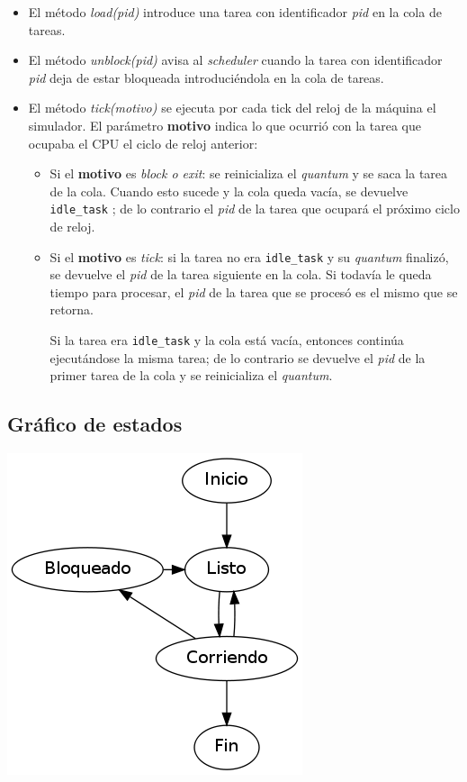 \begin{itemize}
	\item El método \textit{load(pid)} introduce una tarea con identificador \textit{pid} en la cola de tareas.
	
	\item El método \textit{unblock(pid)} avisa al \textit{scheduler} cuando la tarea con identificador \textit{pid} deja de estar bloqueada introduciéndola en la cola de tareas.
	
	\item El método \textit{tick(motivo)} se ejecuta por cada tick del reloj de la máquina el simulador. El parámetro \textbf{motivo} indica lo que ocurrió con la tarea que ocupaba el CPU el ciclo de reloj anterior:
	
	\begin{itemize}
		\item Si el \textbf{motivo} es \textit{block o exit}: se reinicializa el \textit{quantum} y se saca la tarea de la cola. Cuando esto sucede y la cola queda vacía, se devuelve \verb|idle_task| ; de lo contrario el \textit{pid} de la tarea que ocupará el próximo ciclo de reloj.

		\item Si el \textbf{motivo} es \textit{tick}: si la tarea no era \verb|idle_task| y su \textit{quantum} finalizó, se devuelve el \textit{pid} de la tarea siguiente en la cola. Si todavía le queda tiempo para procesar, el \textit{pid} de la tarea que se procesó es el mismo que se retorna.
		
		Si la tarea era \verb|idle_task| y la cola está vacía, entonces continúa ejecutándose la misma tarea; de lo contrario se devuelve el \textit{pid} de la primer tarea de la cola y se reinicializa el \textit{quantum}.
	\end{itemize}

\end{itemize}

\subsection{Gráfico de estados}

\begin{center}
\includegraphics[scale=0.5]{estados.png}
\end{center}
 
